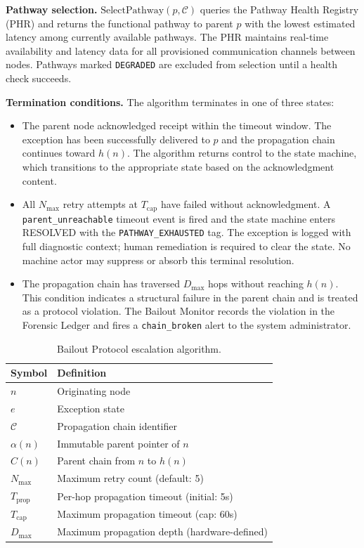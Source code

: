 \bigskip
\noindent\textbf{Pathway selection.} $\text{SelectPathway}(p, \mathcal{C})$ queries the Pathway Health Registry (PHR) and returns the functional pathway to parent $p$ with the lowest estimated latency among currently available pathways. The PHR maintains real-time availability and latency data for all provisioned communication channels between nodes. Pathways marked \texttt{DEGRADED} are excluded from selection until a health check succeeds.

\bigskip
\noindent\textbf{Termination conditions.} The algorithm terminates in one of three states:

\begin{itemize}\itemsep=0pt
\item[\texttt{ESCALATION\_DELIVERED}:] The parent node acknowledged receipt within the timeout window. The exception has been successfully delivered to $p$ and the propagation chain continues toward $h(n)$. The algorithm returns control to the state machine, which transitions to the appropriate state based on the acknowledgment content.

\item[\texttt{PATHWAY\_EXHAUSTED}:] All $N_{\max}$ retry attempts at $T_{\text{cap}}$ have failed without acknowledgment. A \texttt{parent\_unreachable} timeout event is fired and the state machine enters RESOLVED with the \texttt{PATHWAY\_EXHAUSTED} tag. The exception is logged with full diagnostic context; human remediation is required to clear the state. No machine actor may suppress or absorb this terminal resolution.

\item[\texttt{RECURSION\_LIMIT}:] The propagation chain has traversed $D_{\max}$ hops without reaching $h(n)$. This condition indicates a structural failure in the parent chain and is treated as a protocol violation. The Bailout Monitor records the violation in the Forensic Ledger and fires a \texttt{chain\_broken} alert to the system administrator.
\end{itemize}

\begin{table}[htbp]
\caption{Bailout Protocol escalation algorithm.}
\label{tab:escalation-algorithm}
\begin{tabular}{@{}ll@{}}
\toprule
Symbol & Definition \\
\midrule
$n$ & Originating node \\
$e$ & Exception state \\
$\mathcal{C}$ & Propagation chain identifier \\
$\alpha(n)$ & Immutable parent pointer of $n$ \\
$C(n)$ & Parent chain from $n$ to $h(n)$ \\
$N_{\max}$ & Maximum retry count (default: 5) \\
$T_{\text{prop}}$ & Per-hop propagation timeout (initial: 5s) \\
$T_{\text{cap}}$ & Maximum propagation timeout (cap: 60s) \\
$D_{\max}$ & Maximum propagation depth (hardware-defined) \\
\bottomrule
\end{tabular}
\end{table}


